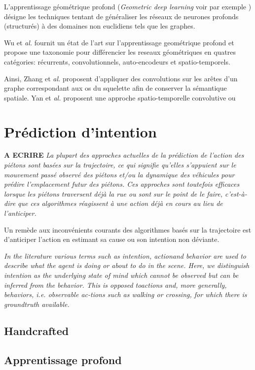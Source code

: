 L'apprentissage géométrique profond (\textit{Geometric deep learning} voir par exemple \cite{gori2005new,scarselli2008graph,bronstein2017geometric}) désigne les techniques tentant de généraliser les réseaux de neurones profonds (structurés) à des domaines non euclidiens tels que les graphes. 

Wu et\textit{ al.} \cite{wu2019comprehensive} fournit un état de l'art sur l'apprentissage geométrique profond et propose une taxonomie pour différencier les reseaux géométriques en quatres catégories: récurrents, convolutionnels, auto-encodeurs et spatio-temporels.

Ainsi, Zhang et\textit{ al.} \cite{2018arXiv180506184Z} proposent d'appliquer des convolutions sur les arêtes d'un graphe correspondant aux os du squelette afin de conserver la sémantique spatiale. Yan et\textit{ al.} \cite{yan2018spatial} proposent une approche spatio-temporelle convolutive ou









\section{Prédiction d'intention}

\textbf{A ECRIRE}
\textit{La plupart des approches actuelles de la prédiction de l'action des piétons sont basées sur la trajectoire, ce qui signifie qu'elles s'appuient sur le mouvement passé observé des piétons et/ou la dynamique des véhicules pour prédire l'emplacement futur des piétons. Ces approches sont toutefois efficaces lorsque les piétons traversent déjà la rue ou sont sur le point de le faire, c'est-à-dire que ces algorithmes réagissent à une action déjà en cours au lieu de l'anticiper.}

Un remède aux inconvénients courants des algorithmes basés sur la trajectoire est d'anticiper l'action en estimant sa cause ou son intention non déviante.


\textit{In the literature various terms such as intention, actionand behavior are used to describe what the agent is doing or about to do in the scene. Here, we distinguish intention as the underlying state of mind which cannot be observed but can be inferred from the behavior. This is opposed toactions and, more generally, behaviors, i.e. observable ac-tions such as walking or crossing, for which there is groundtruth available.}




\subsection{Handcrafted}
\subsection{Apprentissage profond}


